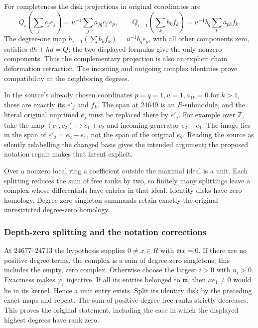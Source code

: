 For completeness the disk projections in original coordinates are \[
 Q_i\!\left(\sum_j c_je_j\right)
   =u^{-1}\!\sum_j a_{jq}c_j\,e_p,\qquad
 Q_{i-1}\!\left(\sum_k b_kf_k\right)
   =u^{-1}b_q\sum_k a_{pk}f_k .
\] The degree-one map \(h_{i-1}(\sum b_kf_k)=u^{-1}b_qe_p\), with all other components zero, satisfies \(dh+hd=Q\); the two displayed formulas give the only nonzero components. Thus the complementary projection is also an explicit chain deformation retraction. The incoming and outgoing complex identities prove compatibility at the neighboring degrees.

In the source's already chosen coordinates \(p=q=1,u=1,a_{1k}=0\) for \(k>1\), these are exactly its \(e'_j\) and \(f_k\). The span at 24649 is an \(R\)-submodule, and the literal original unprimed \(e_j\) must be replaced there by \(e'_j\). For example over \(\mathbb Z\), take the map \((c_1,c_2)\mapsto c_1+c_2\) and incoming generator \(e_2-e_1\). The image lies in the span of \(e'_2=e_2-e_1\), not the span of the original \(e_2\). Reading the source as silently relabelling the changed basis gives the intended argument; the proposed notation repair makes that intent explicit.

Over a nonzero local ring a coefficient outside the maximal ideal is a unit. Each splitting reduces the sum of free ranks by two, so finitely many splittings leave a complex whose differentials have entries in that ideal. Identity disks have zero homology. Degree-zero singleton summands retain exactly the original unrestricted degree-zero homology.

\subsubsection{Depth-zero splitting and the notation corrections}\label{algebra-proof-018-depth-zero-splitting-and-the-notation-corrections}

At 24677--24713 the hypothesis supplies \(0\ne x\in R\) with \(\mathfrak m x=0\). If there are no positive-degree terms, the complex is a sum of degree-zero singletons; this includes the empty, zero complex. Otherwise choose the largest \(i>0\) with \(n_i>0\). Exactness makes \(\varphi_i\) injective. If all its entries belonged to \(\mathfrak m\), then \(xe_1\ne0\) would lie in its kernel. Hence a unit entry exists. Split its identity disk by the preceding exact maps and repeat. The sum of positive-degree free ranks strictly decreases. This proves the original statement, including the case in which the displayed highest degrees have rank zero.

